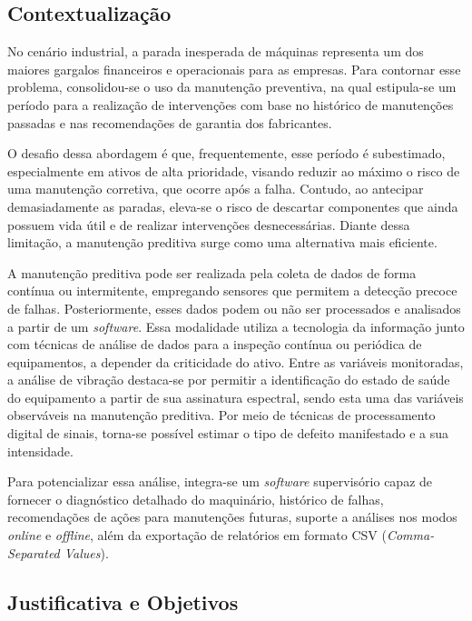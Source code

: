 \documentclass[conference]{IEEEtran}
\begin{document}
\subsection{Contextualização}

No cenário industrial, a parada inesperada de máquinas representa um dos maiores gargalos financeiros e operacionais para as empresas. Para contornar esse problema, consolidou-se o uso da manutenção preventiva, na qual estipula-se um período para a realização de intervenções com base no histórico de manutenções passadas e nas recomendações de garantia dos fabricantes. 

O desafio dessa abordagem é que, frequentemente, esse período é subestimado, especialmente em ativos de alta prioridade, visando reduzir ao máximo o risco de uma manutenção corretiva, que ocorre após a falha. Contudo, ao antecipar demasiadamente as paradas, eleva-se o risco de descartar componentes que ainda possuem vida útil e de realizar intervenções desnecessárias. Diante dessa limitação, a manutenção preditiva surge como uma alternativa mais eficiente.

A manutenção preditiva pode ser realizada pela coleta de dados de forma contínua ou intermitente, empregando sensores que permitem a detecção precoce de falhas. Posteriormente, esses dados podem ou não ser processados e analisados a partir de um \textit{software}.
Essa modalidade utiliza a tecnologia da informação junto com técnicas de análise de dados 
para a inspeção contínua ou periódica de equipamentos, a depender da 
criticidade do ativo. Entre as variáveis monitoradas, a análise de 
vibração destaca-se por permitir a identificação do estado de saúde do 
equipamento a partir de sua assinatura espectral, sendo esta uma das 
variáveis observáveis na manutenção preditiva. Por meio de técnicas de 
processamento digital de sinais, torna-se possível estimar o tipo de 
defeito manifestado e a sua intensidade.

Para potencializar essa análise, integra-se um \textit{software} supervisório capaz de fornecer o diagnóstico detalhado do maquinário, histórico de falhas, recomendações de ações para manutenções futuras, suporte a análises nos modos \textit{online} e \textit{offline}, além da exportação de relatórios em formato CSV (\textit{Comma-Separated Values}).

\subsection{Justificativa e Objetivos}
\end{document}
